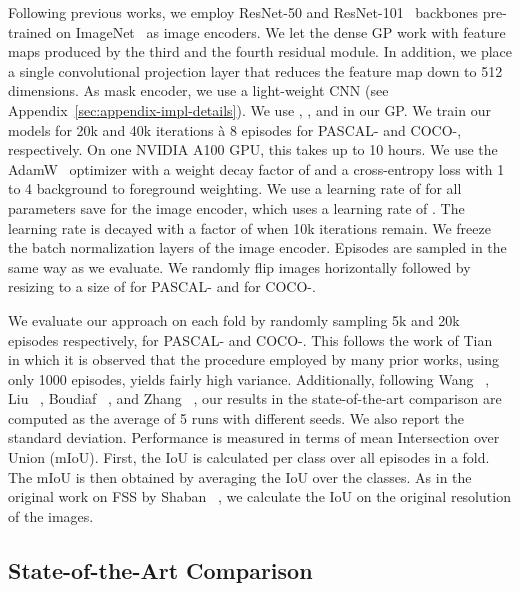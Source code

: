 Following previous works, we employ ResNet-50 and ResNet-101~\cite{he2016deep} backbones pre-trained on ImageNet~\cite{ILSVRC15} as image encoders. We let the dense GP work with feature maps produced by the third and the fourth residual module. In addition, we place a single convolutional projection layer that reduces the feature map down to 512 dimensions. As mask encoder, we use a light-weight CNN (see Appendix~\ref{sec:appendix-impl-details}).  We use , , and  in our GP. We train our models for 20k and 40k iterations à 8 episodes for PASCAL- and COCO-, respectively. On one NVIDIA A100 GPU, this takes up to 10 hours. We use the AdamW~\cite{Kingma2015adam,loshchilov2018decoupled} optimizer with a weight decay factor of  and a cross-entropy loss with 1 to 4 background to foreground weighting. We use a learning rate of  for all parameters save for the image encoder, which uses a learning rate of . The learning rate is decayed with a factor of  when 10k iterations remain. We freeze the batch normalization layers of the image encoder. Episodes are sampled in the same way as we evaluate. We randomly flip images horizontally followed by resizing to a size of  for PASCAL- and  for COCO-.

We evaluate our approach on each fold by randomly sampling 5k and 20k episodes respectively, for PASCAL- and COCO-. This follows the work of Tian \etal~\cite{Tian2020} in which it is observed that the procedure employed by many prior works, using only 1000 episodes, yields fairly high variance. Additionally, following Wang \etal~\cite{Wang2019_PA}, Liu \etal~\cite{Liu2020_PP}, Boudiaf \etal~\cite{boudiaf2021few}, and Zhang \etal~\cite{zhang2021self}, our results in the state-of-the-art comparison are computed as the average of 5 runs with different seeds. We also report the standard deviation. Performance is measured in terms of mean Intersection over Union (mIoU). First, the IoU is calculated per class over all episodes in a fold. The mIoU is then obtained by averaging the IoU over the classes. As in the original work on FSS by Shaban \etal~\cite{Shaban2017}, we calculate the IoU on the original resolution of the images.

\subsection{State-of-the-Art Comparison}\label{sec:sota}

